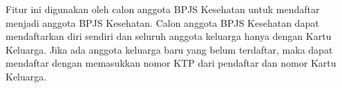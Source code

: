 Fitur ini digunakan oleh calon anggota BPJS Kesehatan untuk mendaftar menjadi anggota BPJS Kesehatan. Calon anggota BPJS Kesehatan dapat mendaftarkan diri sendiri dan seluruh anggota keluarga hanya dengan Kartu Keluarga. Jika ada anggota keluarga baru yang belum terdaftar, maka dapat mendaftar dengan memasukkan nomor KTP dari pendaftar dan nomor Kartu Keluarga.